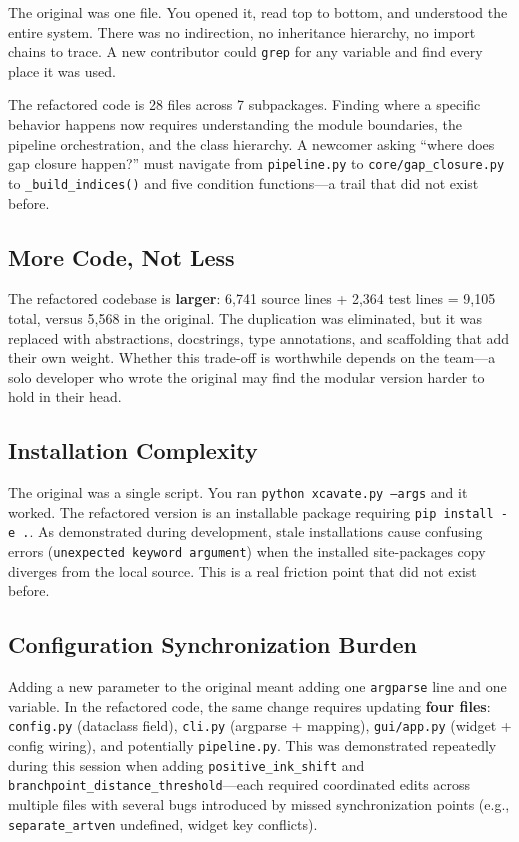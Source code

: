 \documentclass[11pt,a4paper]{article}
\begin{document}
The original was one file. You opened it, read top to bottom, and understood the entire system. There was no indirection, no inheritance hierarchy, no import chains to trace. A new contributor could \texttt{grep} for any variable and find every place it was used.

The refactored code is 28 files across 7 subpackages. Finding where a specific behavior happens now requires understanding the module boundaries, the pipeline orchestration, and the class hierarchy. A newcomer asking ``where does gap closure happen?'' must navigate from \texttt{pipeline.py} to \texttt{core/gap\_closure.py} to \texttt{\_build\_indices()} and five condition functions---a trail that did not exist before.

\subsection{More Code, Not Less}

The refactored codebase is \textbf{larger}: 6,741 source lines + 2,364 test lines = 9,105 total, versus 5,568 in the original. The duplication was eliminated, but it was replaced with abstractions, docstrings, type annotations, and scaffolding that add their own weight. Whether this trade-off is worthwhile depends on the team---a solo developer who wrote the original may find the modular version harder to hold in their head.

\subsection{Installation Complexity}

The original was a single script. You ran \texttt{python xcavate.py --args} and it worked. The refactored version is an installable package requiring \texttt{pip install -e .}. As demonstrated during development, stale installations cause confusing errors (\texttt{unexpected keyword argument}) when the installed site-packages copy diverges from the local source. This is a real friction point that did not exist before.

\subsection{Configuration Synchronization Burden}

Adding a new parameter to the original meant adding one \texttt{argparse} line and one variable. In the refactored code, the same change requires updating \textbf{four files}: \texttt{config.py} (dataclass field), \texttt{cli.py} (argparse + mapping), \texttt{gui/app.py} (widget + config wiring), and potentially \texttt{pipeline.py}. This was demonstrated repeatedly during this session when adding \texttt{positive\_ink\_shift} and \texttt{branchpoint\_distance\_threshold}---each required coordinated edits across multiple files with several bugs introduced by missed synchronization points (e.g., \texttt{separate\_artven} undefined, widget key conflicts).
\end{document}
